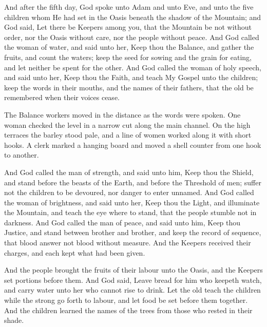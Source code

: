 \begin{scripture}
And after the fifth day, God spoke unto Adam and unto Eve, and unto the five children whom He had set in the Oasis beneath the shadow of the Mountain; and God said, Let there be Keepers among you, that the Mountain be not without order, nor the Oasis without care, nor the people without peace. And God called the woman of water, and said unto her, Keep thou the Balance, and gather the fruits, and count the waters; keep the seed for sowing and the grain for eating, and let neither be spent for the other. And God called the woman of holy speech, and said unto her, Keep thou the Faith, and teach My Gospel unto the children; keep the words in their mouths, and the names of their fathers, that the old be remembered when their voices cease.
\end{scripture}

The Balance workers moved in the distance as the words were spoken. One woman checked the level in a narrow cut along the main channel. On the high terraces the barley stood pale, and a line of women worked along it with short hooks. A clerk marked a hanging board and moved a shell counter from one hook to another. \par

\begin{scripture}
And God called the man of strength, and said unto him, Keep thou the Shield, and stand before the beasts of the Earth, and before the Threshold of men; suffer not the children to be devoured, nor danger to enter unnamed. And God called the woman of brightness, and said unto her, Keep thou the Light, and illuminate the Mountain, and teach the eye where to stand, that the people stumble not in darkness. And God called the man of peace, and said unto him, Keep thou Justice, and stand between brother and brother, and keep the record of sequence, that blood answer not blood without measure. And the Keepers received their charges, and each kept what had been given.
\end{scripture}

\begin{scripture}
And the people brought the fruits of their labour unto the Oasis, and the Keepers set portions before them. And God said, Leave bread for him who keepeth watch, and carry water unto her who cannot rise to drink. Let the old teach the children while the strong go forth to labour, and let food be set before them together. And the children learned the names of the trees from those who rested in their shade.
\end{scripture}

